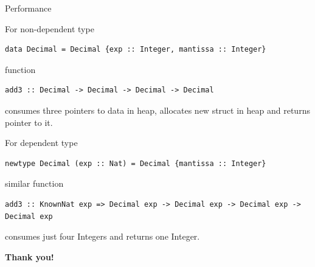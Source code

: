 \documentclass[handout]{beamer}
\begin{document}
\begin{frame}[fragile]{Performance}
\begin{adjustwidth}{-1.5em}{-1.5em}

For non-dependent type
\begin{lstlisting}
data Decimal = Decimal {exp :: Integer, mantissa :: Integer}
\end{lstlisting}
function
\begin{lstlisting}
add3 :: Decimal -> Decimal -> Decimal -> Decimal
\end{lstlisting}
consumes three pointers to data in heap, allocates new struct in heap and returns pointer to it.

\bigskip

For dependent type
\begin{lstlisting}
newtype Decimal (exp :: Nat) = Decimal {mantissa :: Integer}
\end{lstlisting}
similar function
\begin{lstlisting}
add3 :: KnownNat exp => Decimal exp -> Decimal exp -> Decimal exp -> Decimal exp
\end{lstlisting}
consumes just four Integers and returns one Integer.

\end{adjustwidth}
\end{frame}

\begin{frame}
\centerline{\Huge\bf Thank you!}
\end{frame}
\end{document}
